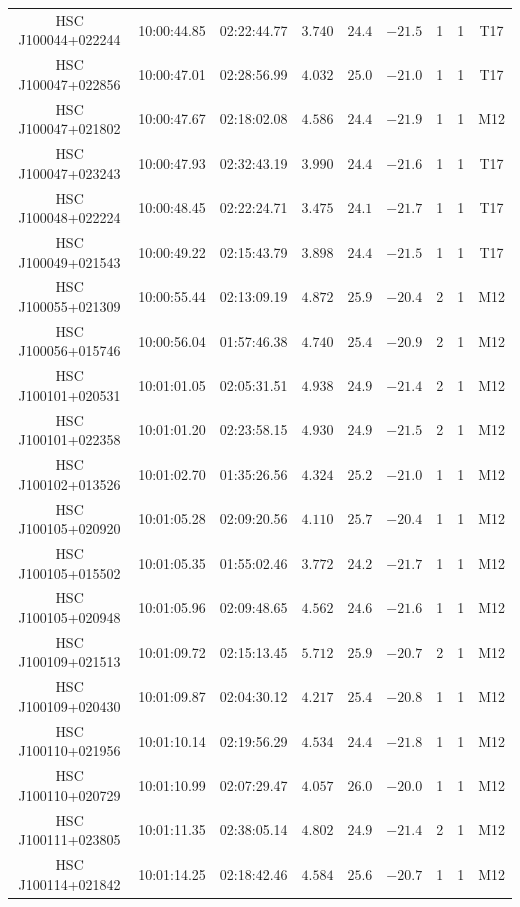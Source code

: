 \documentclass[]{pasj01}
\begin{document}
{\begin{longtable}{ccccccccc}
HSC J100044+022244 & 10:00:44.85 & 02:22:44.77 & $3.740$ & $24.4$ & $-21.5$ & 1 & 1 & T17 \\
HSC J100047+022856 & 10:00:47.01 & 02:28:56.99 & $4.032$ & $25.0$ & $-21.0$ & 1 & 1 & T17 \\
HSC J100047+021802 & 10:00:47.67 & 02:18:02.08 & $4.586$ & $24.4$ & $-21.9$ & 1 & 1 & M12 \\
HSC J100047+023243 & 10:00:47.93 & 02:32:43.19 & $3.990$ & $24.4$ & $-21.6$ & 1 & 1 & T17 \\
HSC J100048+022224 & 10:00:48.45 & 02:22:24.71 & $3.475$ & $24.1$ & $-21.7$ & 1 & 1 & T17 \\
HSC J100049+021543 & 10:00:49.22 & 02:15:43.79 & $3.898$ & $24.4$ & $-21.5$ & 1 & 1 & T17 \\
HSC J100055+021309 & 10:00:55.44 & 02:13:09.19 & $4.872$ & $25.9$ & $-20.4$ & 2 & 1 & M12 \\
HSC J100056+015746 & 10:00:56.04 & 01:57:46.38 & $4.740$ & $25.4$ & $-20.9$ & 2 & 1 & M12 \\
HSC J100101+020531 & 10:01:01.05 & 02:05:31.51 & $4.938$ & $24.9$ & $-21.4$ & 2 & 1 & M12 \\
HSC J100101+022358 & 10:01:01.20 & 02:23:58.15 & $4.930$ & $24.9$ & $-21.5$ & 2 & 1 & M12 \\
HSC J100102+013526 & 10:01:02.70 & 01:35:26.56 & $4.324$ & $25.2$ & $-21.0$ & 1 & 1 & M12 \\
HSC J100105+020920 & 10:01:05.28 & 02:09:20.56 & $4.110$ & $25.7$ & $-20.4$ & 1 & 1 & M12 \\
HSC J100105+015502 & 10:01:05.35 & 01:55:02.46 & $3.772$ & $24.2$ & $-21.7$ & 1 & 1 & M12 \\
HSC J100105+020948 & 10:01:05.96 & 02:09:48.65 & $4.562$ & $24.6$ & $-21.6$ & 1 & 1 & M12 \\
HSC J100109+021513 & 10:01:09.72 & 02:15:13.45 & $5.712$ & $25.9$ & $-20.7$ & 2 & 1 & M12 \\
HSC J100109+020430 & 10:01:09.87 & 02:04:30.12 & $4.217$ & $25.4$ & $-20.8$ & 1 & 1 & M12 \\
HSC J100110+021956 & 10:01:10.14 & 02:19:56.29 & $4.534$ & $24.4$ & $-21.8$ & 1 & 1 & M12 \\
HSC J100110+020729 & 10:01:10.99 & 02:07:29.47 & $4.057$ & $26.0$ & $-20.0$ & 1 & 1 & M12 \\
HSC J100111+023805 & 10:01:11.35 & 02:38:05.14 & $4.802$ & $24.9$ & $-21.4$ & 2 & 1 & M12 \\
HSC J100114+021842 & 10:01:14.25 & 02:18:42.46 & $4.584$ & $25.6$ & $-20.7$ & 1 & 1 & M12 \\

\end{longtable}}
\end{document}

